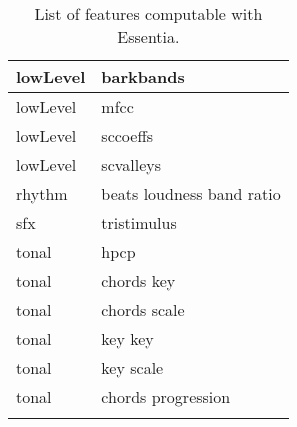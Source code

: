 \begin{center}
\begin{longtable}{| p{} | p{} |}
lowLevel & barkbands \\ \hline
lowLevel & mfcc \\ \hline
lowLevel & sccoeffs \\ \hline
lowLevel & scvalleys \\ \hline
rhythm & beats loudness band ratio \\ \hline
sfx & tristimulus \\ \hline
tonal & hpcp \\ \hline
tonal & chords key \\ \hline
tonal & chords scale \\ \hline
tonal & key key \\ \hline
tonal & key scale \\ \hline
tonal & chords progression \\ \hline

\caption[List of features computable with Essentia]{List of features computable with Essentia.}
\label{table:essentiaFeatures}
\end{longtable}
\end{center}